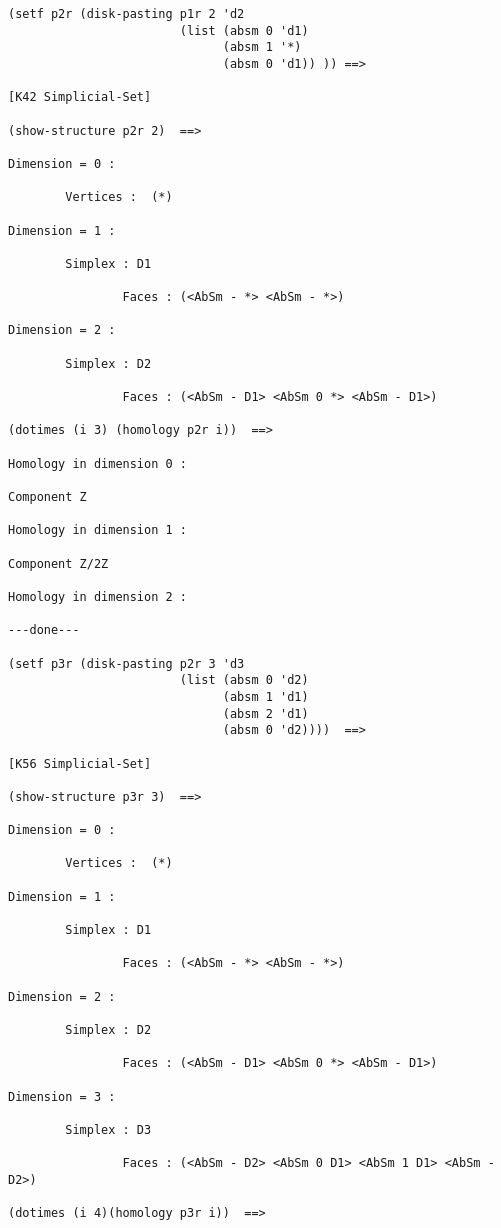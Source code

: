 {\footnotesize\begin{verbatim}
(setf p2r (disk-pasting p1r 2 'd2
                        (list (absm 0 'd1)
                              (absm 1 '*)
                              (absm 0 'd1)) )) ==>

[K42 Simplicial-Set]

(show-structure p2r 2)  ==>

Dimension = 0 :

        Vertices :  (*)

Dimension = 1 :

        Simplex : D1

                Faces : (<AbSm - *> <AbSm - *>)

Dimension = 2 :

        Simplex : D2

                Faces : (<AbSm - D1> <AbSm 0 *> <AbSm - D1>)

(dotimes (i 3) (homology p2r i))  ==>

Homology in dimension 0 :

Component Z

Homology in dimension 1 :

Component Z/2Z

Homology in dimension 2 :

---done---

(setf p3r (disk-pasting p2r 3 'd3
                        (list (absm 0 'd2) 
                              (absm 1 'd1)
                              (absm 2 'd1)
                              (absm 0 'd2))))  ==>

[K56 Simplicial-Set]

(show-structure p3r 3)  ==>

Dimension = 0 :

        Vertices :  (*)

Dimension = 1 :

        Simplex : D1

                Faces : (<AbSm - *> <AbSm - *>)

Dimension = 2 :

        Simplex : D2

                Faces : (<AbSm - D1> <AbSm 0 *> <AbSm - D1>)

Dimension = 3 :

        Simplex : D3

                Faces : (<AbSm - D2> <AbSm 0 D1> <AbSm 1 D1> <AbSm - D2>)

(dotimes (i 4)(homology p3r i))  ==>


\end{verbatim}}
